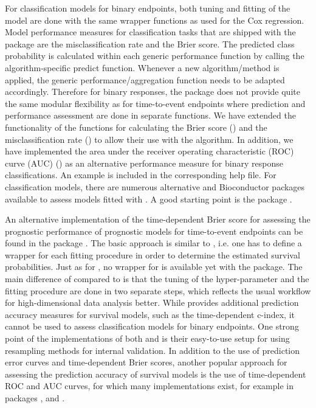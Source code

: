 \documentclass[]{jss}
\begin{document}
For classification models for binary endpoints, both tuning and fitting of the model are done with the same wrapper functions as used for the Cox regression. Model performance measures for classification tasks that are shipped with the  package are the misclassification rate and the Brier score. The predicted class probability is calculated within each generic performance function by calling the algorithm-specific predict function. Whenever a new algorithm/method is applied, the generic performance/aggregation function needs to be adapted accordingly. Therefore for binary responses, the  package does not provide quite the same modular flexibility as for time-to-event endpoints where prediction and performance assessment are done in separate functions.
We have extended the functionality of the  functions for calculating the Brier score () and the misclassification rate () to allow their use with the  algorithm. In addition, we have implemented the area under the receiver operating characteristic (ROC) curve (AUC) () as an alternative performance measure for binary response classifications. An example is included in the corresponding help file. For classification models, there are numerous alternative  and Bioconductor packages available to assess models fitted with . A good starting point is the package  \citep{caret}.

An alternative implementation of the time-dependent Brier score for assessing the prognostic performance of prognostic models for time-to-event endpoints can be found in the package  \citep{MIG2012}. The basic approach is similar to , i.e. one has to define a wrapper for each fitting procedure in order to determine the estimated survival probabilities. Just as for , no wrapper for  is available yet with the  package. The main difference of  compared to  is that the tuning of the hyper-parameter and the fitting procedure are done in two separate steps, which reflects the usual workflow for high-dimensional data analysis better. While  provides additional prediction accuracy measures for survival models, such as the time-dependent c-index, it cannot be used to assess classification models for binary endpoints. One strong point of the implementations of both  and  is their easy-to-use setup for using resampling methods for internal validation. In addition to the use of prediction error curves and time-dependent Brier scores, another popular approach for assessing the prediction accuracy of survival models is the use of time-dependent ROC and AUC curves, for which many implementations exist, for example in  packages  \citep{timeROC},  \citep{survivalROC} and  \citep{risksetROC}. 
\end{document}
